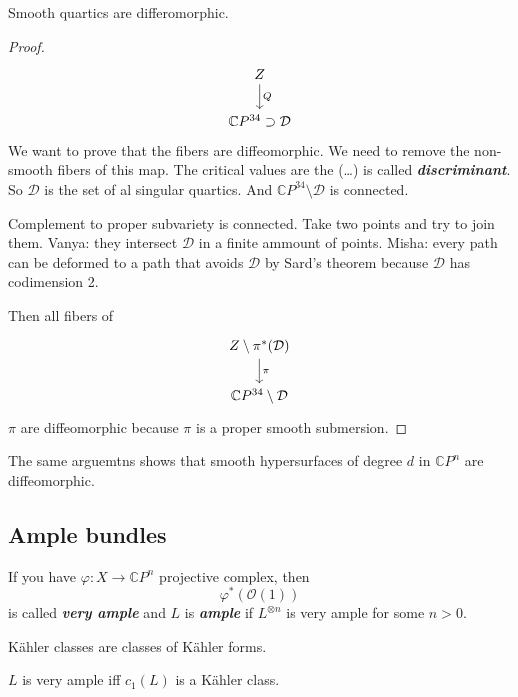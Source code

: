 \begin{coro}
	Smooth quartics are differomorphic.
\end{coro}

\begin{proof}
	\[\begin{tikzcd}
	Z\arrow[d,"Q"]\\
	\mathbb{C}P^{34}\supset\mathcal{D}
	\end{tikzcd}\]
	We want to prove that the fibers are diffeomorphic. We need to remove the non-smooth fibers of this map. The critical values are the (…) is called \textit{\textbf{discriminant}}.  So $\mathcal{D}$ is the set of al singular quartics. And $\mathbb{C}P^{34}\setminus \mathcal{D}$ is connected.

\begin{exercise}
	Complement to proper subvariety is connected. Take two points and try to join them. Vanya: they intersect $\mathcal{D}$ in a finite ammount of points. Misha: every path can be deformed to a path that avoids $\mathcal{D}$ by Sard's theorem because $\mathcal{D}$ has codimension 2.
\end{exercise}
Then all fibers of 
\[\begin{tikzcd}
Z\setminus \pi^* (\mathcal{D})\arrow[d,"\pi"]\\
\mathbb{C}P^{34}\setminus \mathcal{D}
\end{tikzcd}\]
$\pi$ are diffeomorphic because $\pi$ is a proper smooth submersion.
\end{proof}

\begin{remark}
	The same arguemtns shows that smooth hypersurfaces of degree $d$ in $\mathbb{C}P^{n}$ are diffeomorphic.
\end{remark}

\subsection{Ample bundles}

\begin{defn}
If you have $\varphi:X\to \mathbb{C}P^{n}$ projective complex, then 
\[\varphi^*(\mathcal{O}(1))\]
is called \textit{\textbf{very ample}} and  $L$ is \textit{\textbf{ample}} if $L^{\otimes n}$ is very ample for some $n>0$.
\end{defn}

Kähler classes are classes of Kähler forms.

\begin{thm}[Kodaira]\leavevmode
	$L$ is very ample iff $c_1(L)$ is a Kähler class.
	
\end{thm}

